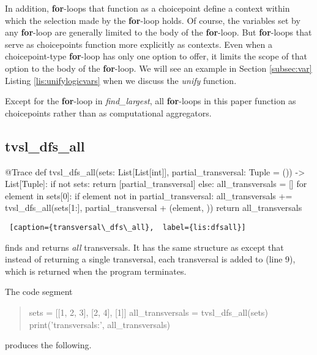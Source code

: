 In addition, \textbf{for}-loops that function as a choicepoint define a context within which the selection made by the \textbf{for}-loop holds. Of course, the variables set by any \textbf{for}-loop are generally limited to the body of the \textbf{for}-loop. But \textbf{for}-loops that serve as choicepoints function more explicitly as contexts. Even when a choicepoint-type \textbf{for}-loop has only one option to offer, it limits the scope of that option to the body of the \textbf{for}-loop. We will see an example in Section \ref{subsec:var} Listing \ref{lis:unifylogicvars} when we discuss the \textit{unify} function.

Except for the \textbf{for}-loop in \textit{find\_largest}, all \textbf{for}-loops in this paper function as choicepoints rather than as computational aggregators. 

\subsection{tvsl\_dfs\_all}

\begin{minipage}{\linewidth} \largev   \hrulefill
\begin{python}[numbers=left]
@Trace
def tvsl_dfs_all(sets: List[List[int]], partial_transversal: Tuple = ()) -> List[Tuple]:
  if not sets:
    return [partial_transversal]
  else:
    all_transversals = []
    for element in sets[0]:
      if element not in partial_transversal:
        all_transversals += tvsl_dfs_all(sets[1:], partial_transversal + (element, ))
    return all_transversals
\end{python}
\begin{lstlisting} [caption={transversal\_dfs\_all},  label={lis:dfsall}]
\end{lstlisting}
\end{minipage}

\smallv

 finds and returns \textit{all} transversals. It has the same structure as  except that instead of returning a single transversal, each transversal is added to  (line 9), which is returned when the program terminates. 

The code segment

\begin{minipage}{\linewidth} \largev  
\begin{quote}
\begin{python}
sets = [[1, 2, 3], [2, 4], [1]]
all_transversals = tvsl_dfs_all(sets)
print('\nAll transversals:', all_transversals)
\end{python}
\end{quote}
\end{minipage}
produces the following. 


